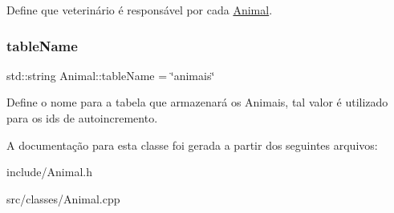 Define que veterinário é responsável por cada \hyperlink{classAnimal}{Animal}. \mbox{\label{classAnimal_a09d2d66762ed1fea5c6858d092b6ccb9}} 
\subsubsection{\texorpdfstring{table\+Name}{tableName}}
{\footnotesize\ttfamily std\+::string Animal\+::table\+Name = \char`\"{}animais\char`\"{}\hspace{0.3cm}{\ttfamily [static]}}

Define o nome para a tabela que armazenará os Animais, tal valor é utilizado para os ids de autoincremento. 

A documentação para esta classe foi gerada a partir dos seguintes arquivos\+:\begin{DoxyCompactItemize}
\item 
include/Animal.\+h\item 
src/classes/Animal.\+cpp\end{DoxyCompactItemize}
